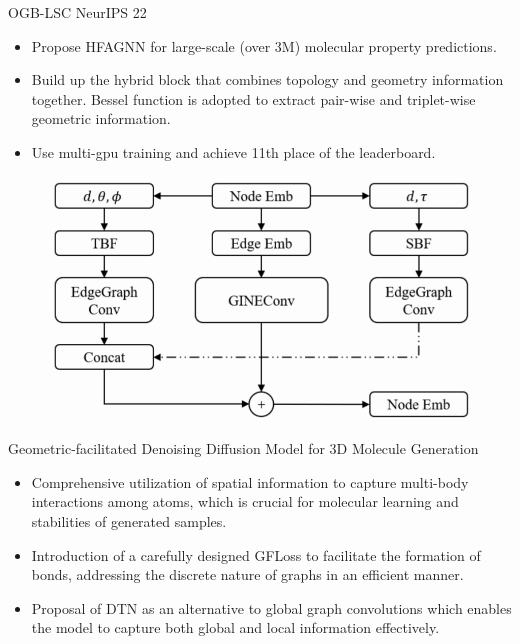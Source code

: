 \documentclass{beamer}
\begin{document}
\begin{frame}{OGB-LSC NeurIPS 22}
    \begin{itemize}
        \item Propose HFAGNN for large-scale (over 3M) molecular property predictions.
        \item Build up the hybrid block that combines topology and geometry information together. Bessel function is adopted to extract pair-wise and triplet-wise geometric information.
        \item Use multi-gpu training and achieve 11th place of the leaderboard. 
    \end{itemize}
    \begin{figure}[H]
        \centering
        \includegraphics[width=0.6\linewidth]{figure/hfagnn.png}
    \end{figure}
\end{frame}

\begin{frame}{Geometric-facilitated Denoising Diffusion Model for 3D Molecule Generation}
    \begin{itemize}
        \item Comprehensive utilization of spatial information to capture multi-body interactions among atoms, which is crucial for molecular learning and stabilities of generated samples.
        \item Introduction of a carefully designed GFLoss to facilitate the formation of bonds, addressing the discrete nature of graphs in an efficient manner.
        \item Proposal of DTN as an alternative to global graph convolutions which enables the model to capture both global and local information effectively.
    \end{itemize}
\end{frame}
\end{document}
